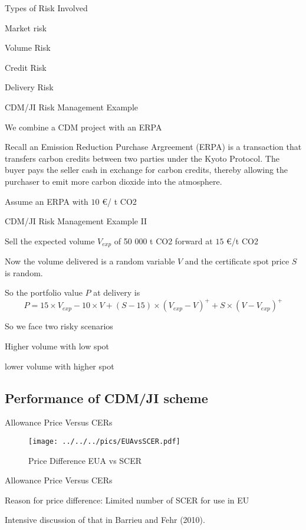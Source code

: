 {Types of Risk Involved}
\item<1-> Market risk
\item<2-> Volume Risk
\item<3-> Credit Risk
\item<4-> Delivery Risk

{CDM/JI Risk Management Example}
\item<1-> We combine a CDM project with an ERPA
\item<2-> Recall an Emission Reduction Purchase Argreement (ERPA) is a  transaction that transfers carbon credits between two parties under the Kyoto Protocol. The buyer pays the seller cash in exchange for carbon credits, thereby allowing the purchaser to emit more carbon dioxide into the atmosphere.
\item<3-> Assume an ERPA with $10$ \euro/ t CO2

{CDM/JI Risk Management Example II}
\item<1-> Sell the expected volume $V_{exp}$ of 50 000 t CO2 forward at $15$ \euro /t CO2
\item<2-> Now the volume delivered is a random variable $V$ and the certificate spot price $S$ is random.
\item<3-> So the portfolio value $P$ at delivery is
\begin{equation}\nonumber
P = 15 \times V_{exp} - 10 \times V + (S-15) \times (V_{exp}-V)^+ + S \times (V-V_{exp})^+
\end{equation}
\item<4-> So we face two risky scenarios
\item Higher volume with low spot
\item lower volume with higher spot

\subsection{Performance of CDM/JI scheme}

{Allowance Price Versus CERs}
\begin{figure}[h!]
\centering
\texttt{[image: ../../../pics/EUAvsSCER.pdf]}
\caption{Price Difference EUA vs SCER}
\label{fig:EUAvsSCER}
\end{figure}

{Allowance Price Versus CERs}
\item<1-> Reason for price difference: Limited number of SCER for use in EU
\item<2-> Intensive discussion of that in Barrieu and Fehr (2010).

